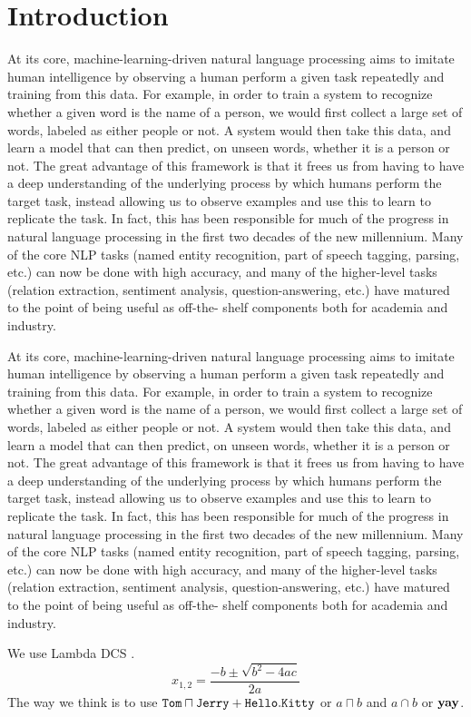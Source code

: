 \chapter{Introduction}

At its core, machine-learning-driven natural language processing aims to imitate human
intelligence by observing a human perform a given task repeatedly and training from this
data. For example, in order to train a system to recognize whether a given word is the
name of a person, we would first collect a large set of words, labeled as either people or
not. A system would then take this data, and learn a
model
that can then predict, on unseen
words, whether it is a person or not. The great advantage of this framework is that it frees
us from having to have a deep understanding of the underlying process by which humans
perform the target task, instead allowing us to observe examples and use this to learn to
replicate the task. In fact, this has been responsible for much of the progress in natural
language processing in the first two decades of the new millennium. Many of the core
NLP tasks (named entity recognition, part of speech tagging, parsing, etc.) can now be
done with high accuracy, and many of the higher-level tasks (relation extraction, sentiment
analysis, question-answering, etc.) have matured to the point of being useful as off-the-
shelf components both for academia and industry.

At its core, machine-learning-driven natural language processing aims to imitate human
intelligence by observing a human perform a given task repeatedly and training from this
data. For example, in order to train a system to recognize whether a given word is the
name of a person, we would first collect a large set of words, labeled as either people or
not. A system would then take this data, and learn a
model
that can then predict, on unseen
words, whether it is a person or not. The great advantage of this framework is that it frees
us from having to have a deep understanding of the underlying process by which humans
perform the target task, instead allowing us to observe examples and use this to learn to
replicate the task. In fact, this has been responsible for much of the progress in natural
language processing in the first two decades of the new millennium. Many of the core
NLP tasks (named entity recognition, part of speech tagging, parsing, etc.) can now be
done with high accuracy, and many of the higher-level tasks (relation extraction, sentiment
analysis, question-answering, etc.) have matured to the point of being useful as off-the-
shelf components both for academia and industry.

We use Lambda DCS \cite{Liang2013LambdaDC}.
\begin{equation}
x_{1,2} = \frac{-b\pm\sqrt{b^2-4ac}}{2a}
\end{equation}
The way we think is to use $\mathtt{Tom} \sqcap \mathtt{Jerry} + \mathtt{Hello}.\mathtt{Kitty}$ or $a \sqcap b$ and $a \cap b$ or $\mathbf{yay}$.
